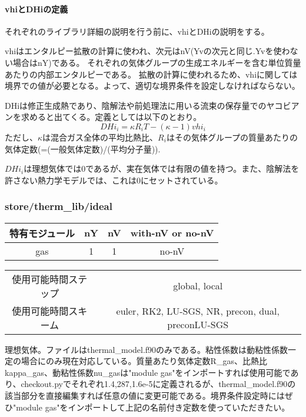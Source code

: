 \documentclass{jsarticle}
\begin{document}
\paragraph{vhiとDHiの定義}%
それぞれのライブラリ詳細の説明を行う前に、vhiとDHiの説明をする。

vhiはエンタルピー拡散の計算に使われ、次元はnV(Yvの次元と同じ.Yvを使わない場合はnY)である。
それぞれの気体グループの生成エネルギーを含む単位質量あたりの内部エンタルピーである。
拡散の計算に使われるため、vhiに関しては境界での値が必要となる。よって、適切な境界条件を設定しなければならない。

DHiは修正生成熱であり、陰解法や前処理法に用いる流束の保存量でのヤコビアンを求めると出てくる。定義としては以下のとおり。
\begin{equation}
DHi_i=\kappa R_i T-(\kappa-1)vhi_i
\end{equation}
ただし、$\kappa$は混合ガス全体の平均比熱比、$R_i$はその気体グループの質量あたりの気体定数(=(一般気体定数)/(平均分子量)).

$DHi_i$は理想気体では0であるが、実在気体では有限の値を持つ。また、陰解法を許さない熱力学モデルでは、これは0にセットされている。

\subsubsection{store/therm\_lib/ideal}%
\begin{center}
\begin{tabular}{cccc}\hline
特有モジュール & nY & nV & with-nV or no-nV\\\hline \hline
gas            &  1 &  1 & no-nV\\
\hline
\end{tabular}
\end{center}

\begin{center}
\begin{tabular}{c||c}\hline
使用可能時間ステップ & global, local\\
使用可能時間スキーム & euler, RK2, LU-SGS, NR, precon, dual, preconLU-SGS\\
\hline
\end{tabular}
\end{center}

理想気体。ファイルはthermal\_model.f90のみである。粘性係数は動粘性係数一定の場合にのみ現在対応している。質量あたり気体定数R\_gas、比熱比kappa\_gas、動粘性係数nu\_gasは"module gas"をインポートすれば使用可能であり、checkout.pyでそれぞれ1.4,287,1.6e-5に定義されるが、thermal\_model.f90の該当部分を直接編集すれば任意の値に変更可能である。境界条件設定時にはぜひ"module gas"をインポートして上記の名前付き定数を使っていただきたい。
\end{document}
